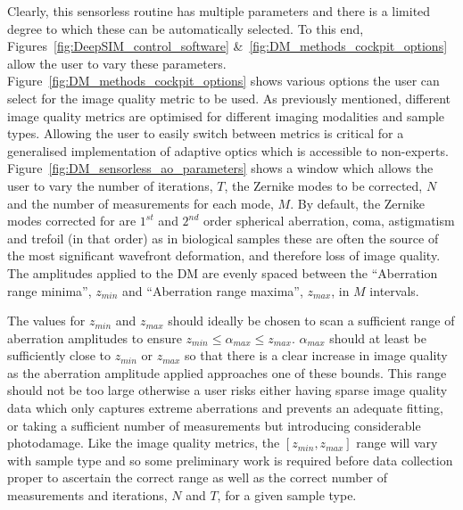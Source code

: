 Clearly, this sensorless routine has multiple parameters and there is a limited degree to which these can be automatically selected. To this end, Figures~\ref{fig:DeepSIM_control_software} \&~\ref{fig:DM_methods_cockpit_options} allow the user to vary these parameters. Figure~\ref{fig:DM_methods_cockpit_options} shows various options the user can select for the image quality metric to be used. As previously mentioned, different image quality metrics are optimised for different imaging modalities and sample types. Allowing the user to easily switch between metrics is critical for a generalised implementation of adaptive optics which is accessible to non-experts. Figure~\ref{fig:DM_sensorless_ao_parameters} shows a window which allows the user to vary the number of iterations, $T$, the Zernike modes to be corrected, $N$ and the number of measurements for each mode, $M$. By default, the Zernike modes corrected for are $1^{st}$ and $2^{nd}$ order spherical aberration, coma, astigmatism and trefoil (in that order) as in biological samples these are often the source of the most significant wavefront deformation, and therefore loss of image quality. The amplitudes applied to the DM are evenly spaced between the ``Aberration range minima'', $z_{min}$ and ``Aberration range maxima'', $z_{max}$, in $M$ intervals.

The values for $z_{min}$ and $z_{max}$ should ideally be chosen to scan a sufficient range of aberration amplitudes to ensure $z_{min} \le \alpha_{max} \le z_{max}$. $\alpha_{max}$ should at least be sufficiently close to $z_{min}$ or $z_{max}$ so that there is a clear increase in image quality as the aberration amplitude applied approaches one of these bounds. This range should not be too large otherwise a user risks either having sparse image quality data which only captures extreme aberrations and prevents an adequate fitting, or taking a sufficient number of measurements but introducing considerable photodamage. Like the image quality metrics, the $[z_{min},z_{max}]$ range will vary with sample type and so some preliminary work is required before data collection proper to ascertain the correct range as well as the correct number of measurements and iterations, $N$ and $T$, for a given sample type. 

